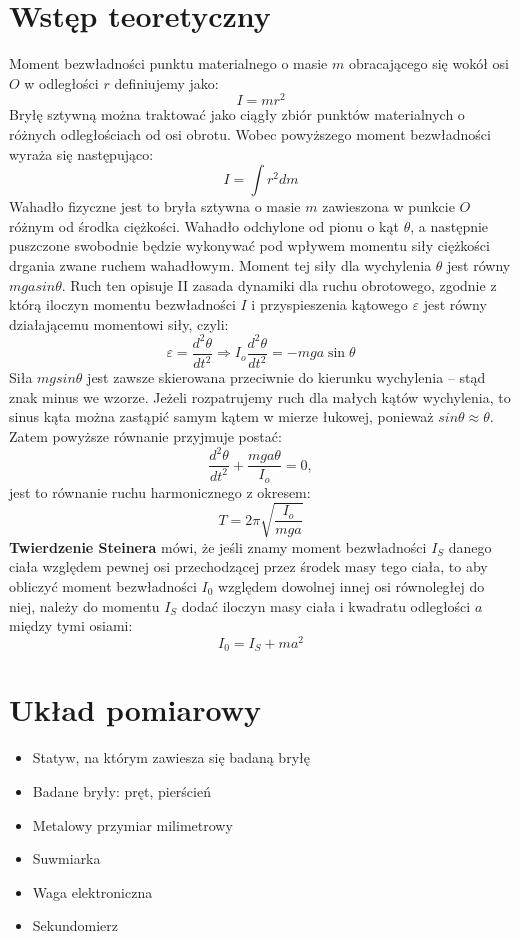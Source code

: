 \documentclass[a4paper,11pt]{article}
\begin{document}
\section{Wstęp teoretyczny}
Moment bezwładności punktu materialnego o masie $m$ obracającego się wokół osi $O$ w odległości $r$ definiujemy jako:
$$I=mr^{2}$$
Bryłę sztywną można traktować jako ciągły zbiór punktów materialnych o różnych odległościach od osi obrotu. Wobec powyższego moment bezwładności wyraża się następująco:
$$I=\int r^{2}dm$$
Wahadło fizyczne jest to bryła sztywna o masie $m$ zawieszona w punkcie $O$ różnym od środka ciężkości. Wahadło odchylone od pionu o kąt $\theta$, a następnie puszczone swobodnie będzie wykonywać pod wpływem momentu siły ciężkości drgania zwane ruchem wahadłowym. Moment tej siły dla wychylenia $\theta$ jest równy $mgasin\theta$. Ruch ten opisuje II zasada dynamiki dla ruchu obrotowego, zgodnie z którą iloczyn momentu bezwładności $I$  i przyspieszenia kątowego $\varepsilon$ jest równy działającemu momentowi siły, czyli:
$$ \varepsilon = \frac{d^{2}\theta}{dt^{2}} \Rightarrow I_{o}\displaystyle \frac{d^{2}\theta}{dt^{2}}=-mga\sin\theta$$
Siła $mgsin\theta$ jest zawsze skierowana przeciwnie do kierunku wychylenia -- stąd znak minus we wzorze.
Jeżeli rozpatrujemy ruch dla małych kątów wychylenia, to sinus kąta można zastąpić samym kątem w mierze łukowej, ponieważ $sin\theta \approx \theta$. Zatem powyższe równanie przyjmuje postać: 
$$\frac{d^{2}\theta}{dt^{2}} + \dfrac{mga\theta}{I_{o}}=0,$$
jest to równanie ruchu harmonicznego z okresem:
$$T=2\pi\sqrt{\frac{I_{o}}{mga}}$$
\textbf{Twierdzenie Steinera} mówi, że jeśli znamy moment bezwładności $I_{S}$ danego ciała względem pewnej osi przechodzącej przez środek masy tego ciała, to aby obliczyć moment bezwładności $I_{0}$ względem dowolnej innej osi równoległej do niej, należy do momentu $I_{S}$ dodać iloczyn masy ciała i kwadratu odległości $a$ między tymi osiami:
$$I_{0}=I_{S}+ma^{2}$$
\section{Układ pomiarowy}

\begin{itemize}
\item Statyw, na którym zawiesza się badaną bryłę
\item Badane bryły: pręt, pierścień
\item Metalowy przymiar milimetrowy
\item Suwmiarka
\item Waga elektroniczna
\item Sekundomierz
\end{itemize}
\end{document}
